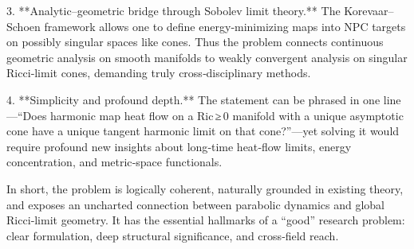 3. **Analytic–geometric bridge through Sobolev limit theory.**  
   The Korevaar–Schoen framework allows one to define energy‑minimizing maps into NPC targets on possibly singular spaces like cones. Thus the problem connects continuous geometric analysis on smooth manifolds to weakly convergent analysis on singular Ricci‑limit cones, demanding truly cross‑disciplinary methods.

4. **Simplicity and profound depth.**  
   The statement can be phrased in one line—“Does harmonic map heat flow on a Ric ≥ 0 manifold with a unique asymptotic cone have a unique tangent harmonic limit on that cone?”—yet solving it would require profound new insights about long‑time heat‑flow limits, energy concentration, and metric‑space functionals.  

In short, the problem is logically coherent, naturally grounded in existing theory, and exposes an uncharted connection between parabolic dynamics and global Ricci‑limit geometry.  It has the essential hallmarks of a “good” research problem: clear formulation, deep structural significance, and cross‑field reach.